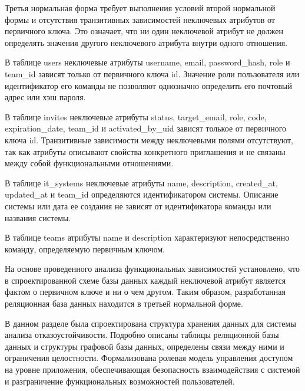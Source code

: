 Третья нормальная форма требует выполнения условий второй нормальной формы и отсутствия 
транзитивных зависимостей неключевых атрибутов от первичного ключа. Это означает, что 
ни один неключевой атрибут не должен определять значения другого неключевого атрибута 
внутри одного отношения.

В таблице users неключевые атрибуты username, email, password\_hash, role и team\_id зависят 
только от первичного ключа id. Значение роли пользователя или идентификатор его 
команды не позволяют однозначно определить его почтовый адрес или хэш пароля.

В таблице invites неключевые атрибуты status, target\_email, role, code, expiration\_date, 
team\_id и activated\_by\_uid зависят толькое от первичного ключа id. Транзитивные зависимости 
между неключевыми полями отсутствуют, так как атрибуты описывают свойства конкретного 
приглашения и не связаны между собой функциональными отношениями.

В таблице it\_systems неключевые атрибуты name, description, created\_at, updated\_at 
и team\_id определяются идентификатором системы. Описание системы или дата ее создания 
не зависят от идентификатора команды или названия системы.

В таблице teams атрибуты name и description характеризуют непосредственно команду, 
определяемую первичным ключом.

На основе проведенного анализа функциональных зависимостей установлено, 
что в спроектированной схеме базы данных каждый неключевой атрибут является фактом о 
первичном ключе и ни о чем другом. Таким образом, разработанная реляционная база 
данных находится в третьей нормальной форме.

В данном разделе была спроектирована структура хранения данных для системы анализа
отказоустойчивости. Подробно описаны таблицы реляционной базы данных и структуры графовой
базы данных, определены связи между ними и ограничения целостности. Формализована ролевая
модель управления доступом на уровне приложения, обеспечивающая безопасность
взаимодействия с системой и разграничение функциональных возможностей пользователей.

